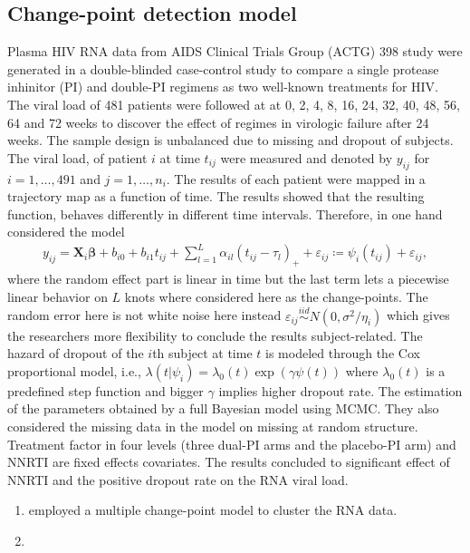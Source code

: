 \documentclass[]{article}
\begin{document}
 		\cite{WangTaylor2001}
		\subsection{Change-point detection model}
		Plasma HIV RNA data from AIDS Clinical Trials Group (ACTG) 398 study \citep{Hammer2002} were generated in a double-blinded case-control study to compare a single protease inhinitor (PI) and double-PI regimens as two well-known treatments for HIV. The viral load of 481 patients were followed at at 0, 2, 4, 8, 16, 24, 32,
		40, 48, 56, 64 and 72 weeks to discover the effect of regimes in virologic failure after 24 weeks. The sample design is unbalanced due to missing and dropout of subjects. The viral load, of patient $i$ at time $t_{ij}$ were measured and denoted by $y_{ij}$ for $i=1,\ldots,491$ and $j=1,\ldots,n_i$. The results of each patient were mapped in a trajectory map as a function of time. The results showed that the resulting function, behaves differently in different time intervals. Therefore, \cite{Ghosh2011} in one hand considered the model 
		\begin{eqnarray*}
			y_{ij}=\mathbf{X}_i\boldsymbol{\beta}+b_{i0}+b_{i1}t_{ij}+\sum_{l=1}^{L}\alpha_{il}(t_{ij}-\tau_l)_++\varepsilon_{ij}\coloneqq \psi_{i}(t_{ij})+\varepsilon_{ij},
		\end{eqnarray*}
		where the random effect part is linear in time but the last term lets a piecewise linear behavior on $L$ knots where considered here as the change-points. The random error here is not white noise here instead $\varepsilon_{ij}\stackrel{iid}{\sim}N(0,\sigma^2/\eta_i)$ which gives the researchers more flexibility to conclude the results subject-related. The hazard of dropout of the $i$th subject at time $t$ is modeled through the Cox proportional model, i.e., $\lambda(t|\psi_i)=\lambda_0(t)\exp(\gamma\psi(t))$ where $\lambda_0(t)$ is a predefined step function and bigger $\gamma$ implies higher dropout rate. The estimation of the parameters obtained by a full Bayesian model using MCMC. They also considered the missing data in the model on missing at random structure. Treatment factor in four levels (three dual-PI arms and the placebo-PI arm) and NNRTI are fixed effects covariates. The results concluded to significant effect of NNRTI and the positive dropout rate on the RNA viral load. 
		
		
		
		
		
		
		\begin{enumerate}
			\item \cite{Ghosh2010} employed a multiple change-point model to cluster the RNA data. 
			\item \cite{Wu2012}
		\end{enumerate}
		
\end{document}
